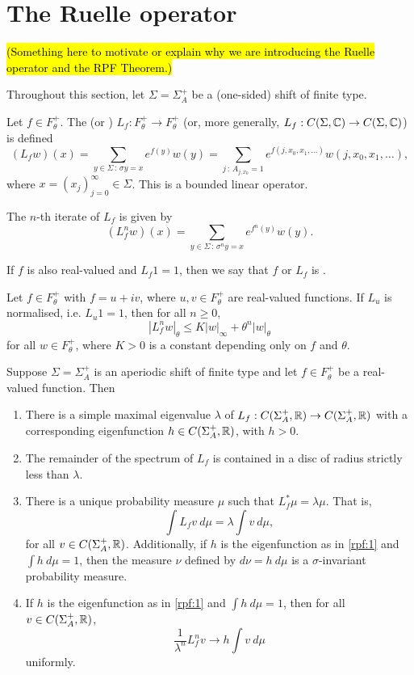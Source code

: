 \section{The Ruelle operator}
\hl{(Something here to motivate or explain why we are introducing the Ruelle operator and the RPF Theorem.)}

Throughout this section, let $\Sigma = \Sigma_A^+$ be a (one-sided) shift of finite type.

\begin{definition}
	Let $f \in F_\theta^+$. The  (or ) $L_f : F_\theta^+ \to F_\theta^+$ (or, more generally, $L_f : C(\Sigma, \mathbb{C}) \to C(\Sigma, \mathbb{C})$) is defined
	\[
		(L_f{w})(x) = \sum_{y \in \Sigma\, :\, \sigma{y} = x}{e^{f(y)} w(y)} = \sum_{j\, :\, A_{j, x_0} = 1}{e^{f(j, x_0, x_1, \dots)} w(j, x_0, x_1, \dots)},
	\]
	where $x = (x_j)_{j = 0}^\infty \in \Sigma$. This is a bounded linear operator.
	
	The $n$-th iterate of $L_f$ is given by
	\[
		(L_f^n{w})(x) = \sum_{y \in \Sigma\, :\, \sigma^n{y} = x}{e^{f^n(y)} w(y)}.
	\]
	
	If $f$ is also real-valued and $L_f{1} = 1$, then we say that $f$ or $L_f$ is .
\end{definition}

\begin{proposition}
	Let $f \in F_\theta^+$ with $f = u + iv$, where $u, v \in F_\theta^+$ are real-valued functions. If $L_u$ is normalised, i.e. $L_u{1} = 1$, then for all $n \geq 0$,
	\[
		|L_f^n{w}|_\theta \leq K|w|_\infty + \theta^n |w|_\theta
	\]
	for all $w \in F_\theta^+$, where $K > 0$ is a constant depending only on $f$ and $\theta$.
\end{proposition}

\begin{theorem}
	Suppose $\Sigma = \Sigma_A^+$ is an aperiodic shift of finite type and let $f \in F_\theta^+$ be a real-valued function. Then
	\begin{enumerate}
		\item There is a simple maximal eigenvalue $\lambda$ of $L_f : C(\Sigma_A^+, \mathbb{R}) \to C(\Sigma_A^+, \mathbb{R})$ with a corresponding eigenfunction $h \in C(\Sigma_A^+, \mathbb{R})$, with $h > 0$. \label{rpf:1}
		\item The remainder of the spectrum of $L_f$ is contained in a disc of radius strictly less than $\lambda$.
		\item There is a unique probability measure $\mu$ such that $L_f^*{\mu} = \lambda\mu$. That is,
		\[
			\int{L_f{v}\ d\mu} = \lambda \int{v\ d\mu},
		\]
		for all $v \in C(\Sigma_A^+, \mathbb{R})$. Additionally, if $h$ is the eigenfunction as in \ref{rpf:1} and $\int{h\ d\mu} = 1$, then the measure $\nu$ defined by $d\nu = h\ d\mu$ is a $\sigma$-invariant probability measure.
		\item If $h$ is the eigenfunction as in \ref{rpf:1} and $\int{h\ d\mu} = 1$, then for all $v \in C(\Sigma_A^+, \mathbb{R})$,
		\[
			\frac{1}{\lambda^n}L_f^n{v} \to h \int{v\ d\mu}
		\]
		uniformly.
	\end{enumerate}
\end{theorem}
